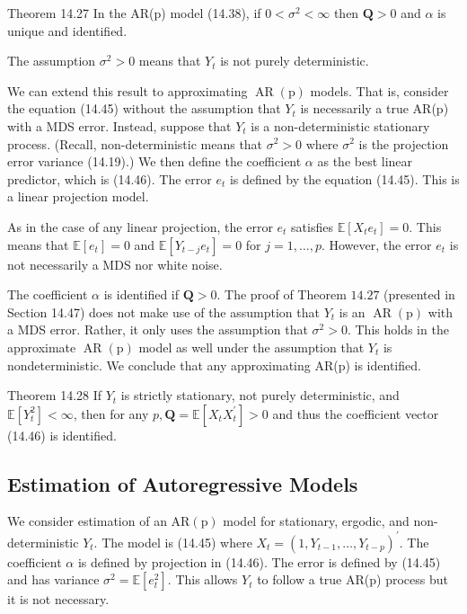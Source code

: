 \documentclass[10pt]{article}
\begin{document}
Theorem 14.27 In the AR(p) model (14.38), if $0<\sigma^{2}<\infty$ then $\boldsymbol{Q}>0$ and $\alpha$ is unique and identified.

The assumption $\sigma^{2}>0$ means that $Y_{t}$ is not purely deterministic.

We can extend this result to approximating $\operatorname{AR}(\mathrm{p})$ models. That is, consider the equation (14.45) without the assumption that $Y_{t}$ is necessarily a true AR(p) with a MDS error. Instead, suppose that $Y_{t}$ is a non-deterministic stationary process. (Recall, non-deterministic means that $\sigma^{2}>0$ where $\sigma^{2}$ is the projection error variance (14.19).) We then define the coefficient $\alpha$ as the best linear predictor, which is (14.46). The error $e_{t}$ is defined by the equation (14.45). This is a linear projection model.

As in the case of any linear projection, the error $e_{t}$ satisfies $\mathbb{E}\left[X_{t} e_{t}\right]=0$. This means that $\mathbb{E}\left[e_{t}\right]=0$ and $\mathbb{E}\left[Y_{t-j} e_{t}\right]=0$ for $j=1, \ldots, p$. However, the error $e_{t}$ is not necessarily a MDS nor white noise.

The coefficient $\alpha$ is identified if $\boldsymbol{Q}>0$. The proof of Theorem $14.27$ (presented in Section 14.47) does not make use of the assumption that $Y_{t}$ is an $\operatorname{AR}(\mathrm{p})$ with a MDS error. Rather, it only uses the assumption that $\sigma^{2}>0$. This holds in the approximate $\operatorname{AR}(\mathrm{p})$ model as well under the assumption that $Y_{t}$ is nondeterministic. We conclude that any approximating AR(p) is identified.

Theorem 14.28 If $Y_{t}$ is strictly stationary, not purely deterministic, and $\mathbb{E}\left[Y_{t}^{2}\right]<\infty$, then for any $p, \boldsymbol{Q}=\mathbb{E}\left[X_{t} X_{t}^{\prime}\right]>0$ and thus the coefficient vector (14.46) is identified.

\subsection{Estimation of Autoregressive Models}
We consider estimation of an $\mathrm{AR}(\mathrm{p})$ model for stationary, ergodic, and non-deterministic $Y_{t}$. The model is (14.45) where $X_{t}=\left(1, Y_{t-1}, \ldots, Y_{t-p}\right)^{\prime}$. The coefficient $\alpha$ is defined by projection in (14.46). The error is defined by (14.45) and has variance $\sigma^{2}=\mathbb{E}\left[e_{t}^{2}\right]$. This allows $Y_{t}$ to follow a true AR(p) process but it is not necessary.
\end{document}
